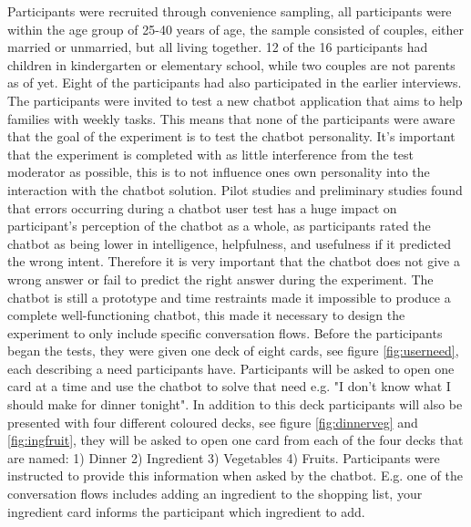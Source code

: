     Participants were recruited through convenience sampling, all participants were within the age group of 25-40 years of age, the sample consisted of couples, either married or unmarried, but all living together. 12 of the 16 participants had children in kindergarten or elementary school, while two couples are not parents as of yet. Eight of the participants had also participated in the earlier interviews. The participants were invited to test a new chatbot application that aims to help families with weekly tasks. This means that none of the participants were aware that the goal of the experiment is to test the chatbot personality. It's important that the experiment is completed with as little interference from the test moderator as possible, this is to not influence ones own personality into the interaction with the chatbot solution. Pilot studies and preliminary studies found that errors occurring during a chatbot user test has a huge impact on participant's perception of the chatbot as a whole, as participants rated the chatbot as being lower in intelligence, helpfulness, and usefulness if it predicted the wrong intent. Therefore it is very important that the chatbot does not give a wrong answer or fail to predict the right answer during the experiment. The chatbot is still a prototype and time restraints made it impossible to produce a complete well-functioning chatbot, this made it necessary to design the experiment to only include specific conversation flows. Before the participants began the tests, they were given one deck of eight cards, see figure \ref{fig:userneed}, each describing a need participants have. Participants will be asked to open one card at a time and use the chatbot to solve that need e.g. "I don't know what I should make for dinner tonight". In addition to this deck participants will also be presented with four different coloured decks, see figure \ref{fig:dinnerveg} and \ref{fig:ingfruit}, they will be asked to open one card from each of the four decks that are named: 1) Dinner 2) Ingredient 3) Vegetables 4) Fruits. Participants were instructed to provide this information when asked by the chatbot. E.g. one of the conversation flows includes adding an ingredient to the shopping list, your ingredient card informs the participant which ingredient to add.
   
